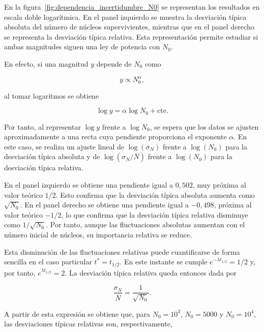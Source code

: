 \documentclass[12pt,a4paper]{article}
\begin{document}
En la figura~\ref{fig:dependencia_incertidumbre_N0} se representan los resultados en escala doble logarítmica. En el panel izquierdo se muestra la desviación típica absoluta del número de núcleos supervivientes, mientras que en el panel derecho se representa la desviación típica relativa. Esta representación permite estudiar si ambas magnitudes siguen una ley de potencia con $N_0$.

En efecto, si una magnitud $y$ depende de $N_0$ como

\begin{equation}
y \propto N_0^\alpha,
\end{equation}

al tomar logaritmos se obtiene

\begin{equation}
\log y = \alpha \log N_0 + \text{cte}.
\end{equation}

Por tanto, al representar $\log y$ frente a $\log N_0$, se espera que los datos se ajusten aproximadamente a una recta cuya pendiente proporciona el exponente $\alpha$. En este caso, se realiza un ajuste lineal de $\log(\sigma_N)$ frente a $\log(N_0)$ para la desviación típica absoluta y de $\log(\sigma_N/\overline{N})$ frente a $\log(N_0)$ para la desviación típica relativa.

En el panel izquierdo se obtiene una pendiente igual a $0{,}502$, muy próxima al valor teórico $1/2$. Esto confirma que la desviación típica absoluta aumenta como $\sqrt{N_0}$. En el panel derecho se obtiene una pendiente igual a $-0{,}498$, próxima al valor teórico $-1/2$, lo que confirma que la desviación típica relativa disminuye como $1/\sqrt{N_0}$. Por tanto, aunque las fluctuaciones absolutas aumentan con el número inicial de núcleos, su importancia relativa se reduce.

Esta disminución de las fluctuaciones relativas puede cuantificarse de forma sencilla en el caso particular $t^*=t_{1/2}$. En este instante se cumple $e^{-\lambda t_{1/2}}=1/2$ y, por tanto, $e^{\lambda t_{1/2}}=2$. La desviación típica relativa queda entonces dada por

\begin{equation}
\frac{\sigma_N}{\overline{N}}
=
\frac{1}{\sqrt{N_0}}.
\end{equation}

A partir de esta expresión se obtiene que, para $N_0=10^3$, $N_0=5000$ y $N_0=10^4$, las desviaciones típicas relativas son, respectivamente,
\end{document}
